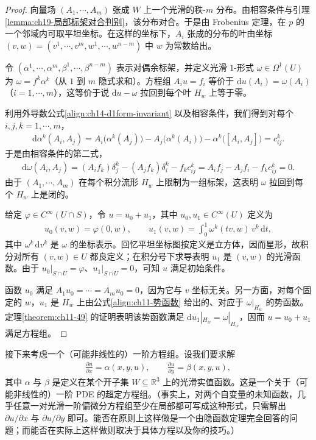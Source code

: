 \documentclass[../../main.tex]{subfiles}
\begin{document}
\begin{proof}
向量场 $(A_1,\cdots ,A_m)$ 张成 $W$ 上一个光滑的秩-$m$ 分布。由相容条件与引理\cref{lemma:ch19-局部标架对合判别}，该分布对合。于是由 Frobenius 定理，在 $p$ 的一个邻域内可取平坦坐标。在这样的坐标下，$A_i$ 张成的分布的叶由坐标 $(v,w)=(v^1,\cdots ,v^m,w^1,\cdots ,w^{n-m})$ 中 $w$ 为常数给出。

令 $(\alpha^1,\cdots ,\alpha^m,\beta^1,\cdots ,\beta^{n-m})$ 表示对偶余标架，并定义光滑 $1$-形式 $\omega\in\Omega^1(U)$ 为 $\omega=f^k\alpha^k$（从 $1$ 到 $m$ 隐式求和）。方程组 $A_i u=f_i$ 等价于 $\mathrm{d}u(A_i)=\omega(A_i)$（$i=1,\cdots ,m$），这等价于说 $\mathrm{d}u-\omega$ 拉回到每个叶 $H_w$ 上等于零。

利用外导数公式\eqref{align:ch14-d1form-invariant} 以及相容条件，我们得到对每个 $i,j,k=1,\cdots ,m$，
\begin{align*}
\mathrm{d}\alpha^k(A_i,A_j)=A_i\bigl(\alpha^k(A_j)\bigr)-A_j\bigl(\alpha^k(A_i)\bigr)-\alpha^k\bigl([A_i,A_j]\bigr)=c^k_{ij}.
\end{align*}
于是由相容条件的第二式，
\begin{align*}
\mathrm{d}\omega(A_i,A_j)=(A_i f_k)\delta^k_j-(A_j f_k)\delta^k_i-f_k c^k_{ij}=A_i f_j-A_j f_i-f_k c^k_{ij}=0.
\end{align*}
由于 $(A_1,\cdots ,A_m)$ 在每个积分流形 $H_w$ 上限制为一组标架，这表明 $\omega$ 拉回到每个 $H_w$ 上是闭的。

给定 $\varphi\in C^\infty(U\cap S)$，令 $u=u_0+u_1$，其中 $u_0,u_1\in C^\infty(U)$ 定义为
\begin{align*}
u_0(v,w)=\varphi(0,w),\qquad
u_1(v,w)=\int_0^1 \omega^k(tv,w)\,v^k\,\mathrm{d}t,
\end{align*}
其中 $\omega^k\,\mathrm{d}v^k$ 是 $\omega$ 的坐标表示。回忆平坦坐标图按定义是立方体，因而星形，故积分对所有 $(v,w)\in U$ 都良定义；在积分号下求导表明 $u_1$ 是 $(v,w)$ 的光滑函数。由于 $u_0|_{S\cap U}=\varphi$、$u_1|_{S\cap U}=0$，可知 $u$ 满足初始条件。

函数 $u_0$ 满足 $A_1u_0=\cdots=A_mu_0=0$，因为它与 $v$ 坐标无关。另一方面，对每个固定的 $w$，$u_1$ 是 $H_w$ 上由公式\eqref{align:ch11-势函数} 给出的、对应于 $\omega|_{H_w}$ 的势函数。定理\cref{theorem:ch11-49} 的证明表明该势函数满足 $\mathrm{d}u_1|_{H_w}=\omega|_{H_w}$，因而 $u=u_0+u_1$ 满足方程组。
\end{proof}

接下来考虑一个（可能非线性的）一阶方程组。设我们要求解
\begin{align}
\frac{\partial u}{\partial x}=\alpha(x,y,u),\qquad \frac{\partial u}{\partial y}=\beta(x,y,u),
\end{align}
其中 $\alpha$ 与 $\beta$ 是定义在某个开子集 $W\subseteq\mathbb{R}^3$ 上的光滑实值函数。这是一个关于（可能非线性的）一阶 PDE 的超定方程组。（事实上，对两个自变量的未知函数，几乎任意一对光滑一阶偏微分方程组至少在局部都可写成这种形式，只需解出 $\partial u/\partial x$ 与 $\partial u/\partial y$ 即可。能否在原则上这样做是一个由隐函数定理完全回答的问题；而能否在实际上这样做则取决于具体方程以及你的技巧。）
\end{document}
